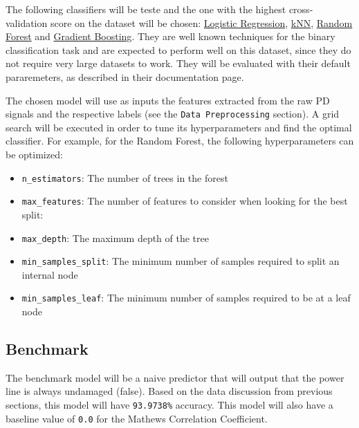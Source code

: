 \documentclass[11pt]{article}
\providecommand{\tightlist}{%
      \setlength{\itemsep}{0pt}\setlength{\parskip}{0pt}}
\begin{document}
The following classifiers will be teste and the one with the highest
cross-validation score on the dataset will be chosen:
\href{https://scikit-learn.org/stable/modules/generated/sklearn.linear_model.LogisticRegression.html}{Logistic
Regression},
\href{https://scikit-learn.org/stable/modules/generated/sklearn.neighbors.KNeighborsClassifier.html}{kNN},
\href{https://scikit-learn.org/stable/modules/generated/sklearn.ensemble.RandomForestClassifier.html}{Random
Forest} and
\href{https://scikit-learn.org/stable/modules/generated/sklearn.ensemble.GradientBoostingClassifier.html}{Gradient
Boosting}. They are well known techniques for the binary classification
task and are expected to perform well on this dataset, since they do not
require very large datasets to work. They will be evaluated with their
default pararemeters, as described in their documentation page.

The chosen model will use as inputs the features extracted from the raw
PD signals and the respective labels (see the
\texttt{Data\ Preprocessing} section). A grid search will be executed in
order to tune its hyperparameters and find the optimal classifier. For
example, for the Random Forest, the following hyperparameters can be
optimized:

\begin{itemize}
\tightlist
\item
  \texttt{n\_estimators}: The number of trees in the forest
\item
  \texttt{max\_features}: The number of features to consider when
  looking for the best split:
\item
  \texttt{max\_depth}: The maximum depth of the tree
\item
  \texttt{min\_samples\_split}: The minimum number of samples required
  to split an internal node
\item
  \texttt{min\_samples\_leaf}: The minimum number of samples required to
  be at a leaf node
\end{itemize}

\hypertarget{benchmark}{%
\subsection{Benchmark}\label{benchmark}}

The benchmark model will be a naive predictor that will output that the
power line is always undamaged (false). Based on the data discussion
from previous sections, this model will have \texttt{93.9738\%}
accuracy. This model will also have a baseline value of \texttt{0.0} for
the Mathews Correlation Coefficient.
\end{document}
